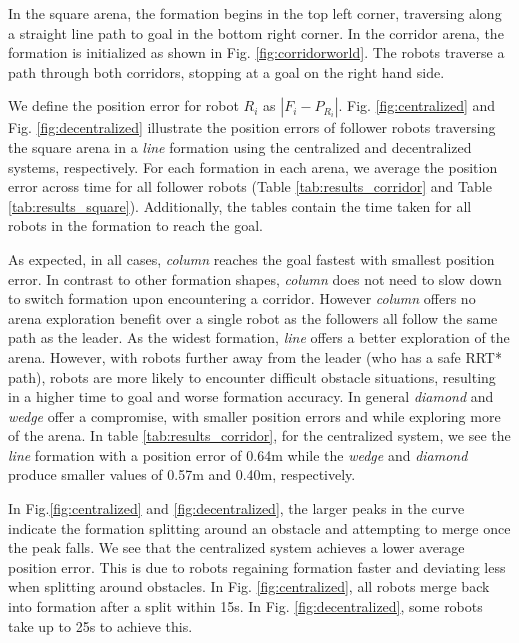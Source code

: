 \documentclass[letterpaper, 10 pt, conference]{ieeeconf}  %
\begin{document}
In the square arena, the formation begins in the top left corner, traversing along a straight line path to goal in the bottom right corner. In the corridor arena, the formation is initialized as shown in Fig. \ref{fig:corridorworld}. The robots traverse a path through both corridors, stopping at a goal on the right hand side.

We define the position error for robot $R_i$ as $|F_{i} - P_{R_i}|$. Fig. \ref{fig:centralized} and Fig. \ref{fig:decentralized} illustrate the position errors of follower robots traversing the square arena in a \textit{line} formation using the centralized and decentralized systems, respectively. For each formation in each arena, we average the position error across time for all follower robots (Table \ref{tab:results_corridor} and Table \ref{tab:results_square}). Additionally, the tables contain the time taken for all robots in the formation to reach the goal.

As expected, in all cases, \textit{column} reaches the goal fastest with smallest position error. In contrast to other formation shapes, \textit{column} does not need to slow down to switch formation upon encountering a corridor. However \textit{column} offers no arena exploration benefit over a single robot as the followers all follow the same path as the leader. As the widest formation, \textit{line} offers a better exploration of the arena. However, with robots further away from the leader (who has a safe RRT* path), robots are more likely to encounter difficult obstacle situations, resulting in a higher time to goal and worse formation accuracy. In general \textit{diamond} and \textit{wedge} offer a compromise, with smaller position errors and while exploring more of the arena. In table \ref{tab:results_corridor}, for the centralized system, we see the \textit{line} formation with a position error of 0.64m while the \textit{wedge} and \textit{diamond} produce smaller values of 0.57m and 0.40m, respectively.

In Fig.\ref{fig:centralized} and \ref{fig:decentralized}, the larger peaks in the curve indicate the formation splitting around an obstacle and attempting to merge once the peak falls. We see that the centralized system achieves a lower average position error. This is due to robots regaining formation faster and deviating less when splitting around obstacles. In Fig. \ref{fig:centralized}, all robots merge back into formation after a split within 15s. In Fig. \ref{fig:decentralized}, some robots take up to 25s to achieve this. 
\end{document}
